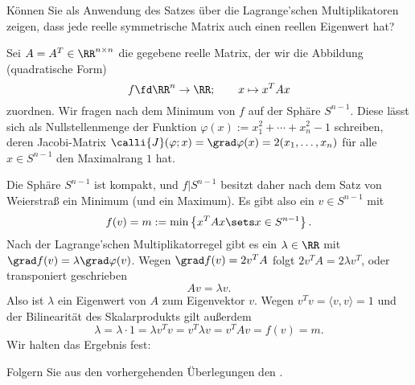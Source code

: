 \begin{frage}
  Können Sie als Anwendung des Satzes über die Lagrange'schen Multiplikatoren 
  zeigen, dass jede reelle symmetrische Matrix auch einen reellen Eigenwert 
  hat?
\end{frage}

\begin{antwort}
  Sei $A=A^T \in\RR^{n\times n}$ die gegebene reelle Matrix, der 
  wir die Abbildung (quadratische Form)
  \[
  f \fd \RR^n \to \RR; \qquad x \mapsto x^T Ax
  \]
  zuordnen. Wir fragen nach dem Minimum von $f$ auf der Sphäre 
  $S^{n-1}$. Diese lässt sich als Nullstellenmenge 
  der Funktion $\varphi(x):= x_1^2 + \cdots + x_n^2-1$ schreiben, deren  
  Jacobi-Matrix $\calli{J}(\varphi; x) = 
  \grad\varphi(x)=2( x_1,\ldots,x_n)$ 
  für alle $x\in S^{n-1}$ den Maximalrang $1$ hat. 

  Die Sphäre $S^{n-1}$ ist kompakt, und $f|S^{n-1}$ besitzt daher 
  nach dem Satz von Weierstraß ein Minimum (und ein Maximum). 
  Es gibt also ein $v\in S^{n-1}$ mit 
  \[
  f(v) = m := \min \left\{ x^T A x\sets x\in S^{n-1} \right\}.
  \]
  Nach der Lagrange'schen Multiplikatorregel gibt es ein $\lambda\in \RR$ mit 
  $\grad f( v )= \lambda \grad \varphi(v)$. Wegen 
  $\grad f(v)=2v^T A$  folgt $2v^T A=2 \lambda v^T$, 
  oder transponiert geschrieben 
  \[
  \boxed{ 
    Av = \lambda v. 
  } 
  \]
  Also ist $\lambda$ ein Eigenwert von $A$ zum Eigenvektor $v$. 
  Wegen $v^T v = \langle v,v \rangle =1$ und der Bilinearität des 
  Skalarprodukts gilt außerdem
  \[
  \lambda = \lambda \cdot 1 = \lambda v^T v = v^T \lambda v = v^T A v =f(v)=m.
  \]
  Wir halten das Ergebnis fest: 

  \medskip\noindent%
  \AntEnd
\end{antwort}


\begin{frage}\label{10_hauptachse}
  Folgern Sie aus den vorhergehenden Überlegungen den 
  .
\end{frage}

